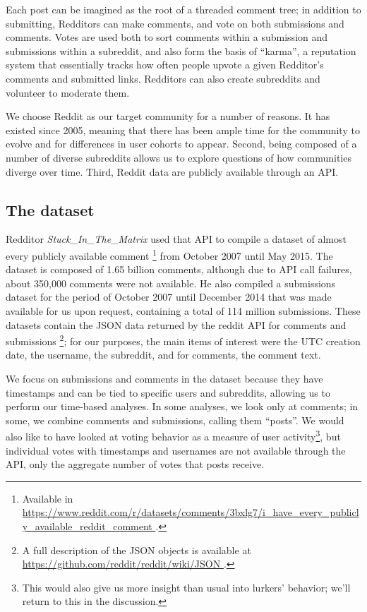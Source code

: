 Each post can be imagined as the root of a threaded comment tree; in addition to submitting, Redditors can make comments, and vote on both submissions and comments.  Votes are used both to sort comments within a submission and submissions within a subreddit, and also form the basis of ``karma'', a reputation system that essentially tracks how often people upvote a given Redditor's comments and submitted links.  Redditors can also create subreddits and volunteer to moderate them.

We choose Reddit as our target community for a number of reasons.  It has existed since 2005, meaning that there has been ample time for the community to evolve and for differences in user cohorts to appear.  Second, being composed of a number of diverse subreddits allows us to explore questions of how communities diverge over time.  Third, Reddit data are publicly available through an API.

\subsection{The dataset}

Redditor \textit{Stuck\_In\_The\_Matrix} used that API to compile a dataset of almost every publicly available comment \footnote{Available in \url{https://www.reddit.com/r/datasets/comments/3bxlg7/i_have_every_publicly_available_reddit_comment }.} from October 2007 until May 2015.  The dataset is composed of 1.65 billion comments, although due to API call failures, about 350,000 comments were not available.  He also compiled a submissions dataset for the period of October 2007 until December 2014 that was made available for us upon request, containing a total of 114 million submissions.  These datasets contain the JSON data returned by the reddit API for comments and submissions \footnote{A full description of the JSON objects is available at \url{https://github.com/reddit/reddit/wiki/JSON }.}; for our purposes, the main items of interest were the UTC creation date, the username, the subreddit, and for comments, the comment text.

We focus on submissions and comments in the dataset because they have timestamps and can be tied to specific users and subreddits, allowing us to perform our time-based analyses.   In some analyses, we look only at comments; in some, we combine comments and submissions, calling them ``posts''.  We would also like to have looked at voting behavior as a measure of user activity\footnote{This would also give us more insight than usual into lurkers' behavior; we'll return to this in the discussion.}, but individual votes with timestamps and usernames are not available through the API, only the aggregate number of votes that posts receive.

